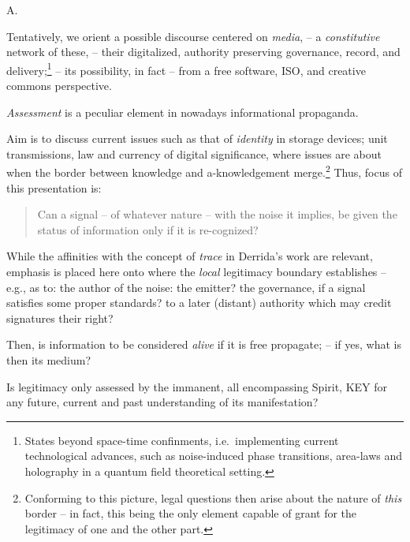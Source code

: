 \documentclass[11pt,oneside,titlepage,final,a4paper]{article}
\title{%
}
\begin{document}
{\sc A.}

\smallskip

Tentatively, we orient a possible discourse centered on
\textit{media}, -- a \textit{constitutive} network of these, -- their
digitalized, authority preserving governance, record, and
delivery;\footnote{States beyond space-time confinments,
  i.e.~implementing current technological advances, such as
  noise-induced phase transitions, area-laws and holography in a
  quantum field theoretical setting.%
} -- its possibility, in fact -- from a free software, ISO, and
creative commons perspective.

\textit{Assessment} is a peculiar element in nowadays informational
propaganda.

Aim is to discuss current issues such as that of \textit{identity} in
storage devices; unit transmissions, law and currency of digital
significance, where issues are about when the border between knowledge
and a-knowledgement merge.\footnote{Conforming to this picture, legal
  questions then arise about the nature of \textit{this} border -- in
  fact, this being the only element capable of grant for the
  legitimacy of one and the other part.} Thus, focus of this
presentation is:
\begin{quote} %
  {\sc Can a signal  -- of whatever nature -- 
  with the noise it implies, be given the %
  status of information only if it is
  re-cognized?}%
\end{quote}%
While the affinities with the concept of \textit{trace} in Derrida's work are relevant, 
emphasis is placed here onto where the \textit{local} legitimacy boundary
establishes -- e.g., as to: the author of the noise: the emitter? the
governance, if a signal satisfies some proper standards? to a later
(distant) authority which may credit signatures their right?

Then, is information to be considered \textit{alive} if it is free
propagate; -- if yes, what is then its medium?

Is legitimacy only assessed by the immanent, all encompassing Spirit,
{\sc KEY} for any future, current and past understanding of its
manifestation?
\end{document}
